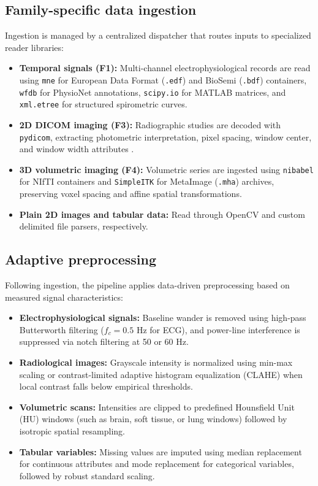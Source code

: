 \subsection{Family-specific data ingestion}
Ingestion is managed by a centralized dispatcher that routes inputs to specialized reader libraries:
\begin{itemize}
    \item \textbf{Temporal signals (F1):} Multi-channel electrophysiological records are read using \texttt{mne} \cite{gramfort2013mne} for European Data Format (\texttt{.edf}) and BioSemi (\texttt{.bdf}) containers, \texttt{wfdb} \cite{goldberger2000physionet} for PhysioNet annotations, \texttt{scipy.io} for MATLAB matrices, and \texttt{xml.etree} for structured spirometric curves.
    \item \textbf{2D DICOM imaging (F3):} Radiographic studies are decoded with \texttt{pydicom}, extracting photometric interpretation, pixel spacing, window center, and window width attributes \cite{dicom2023standard}.
    \item \textbf{3D volumetric imaging (F4):} Volumetric series are ingested using \texttt{nibabel} for NIfTI containers and \texttt{SimpleITK} \cite{lowekamp2013simpleitk} for MetaImage (\texttt{.mha}) archives, preserving voxel spacing and affine spatial transformations.
    \item \textbf{Plain 2D images and tabular data:} Read through OpenCV and custom delimited file parsers, respectively.
\end{itemize}

\subsection{Adaptive preprocessing}
Following ingestion, the pipeline applies data-driven preprocessing based on measured signal characteristics:
\begin{itemize}
    \item \textbf{Electrophysiological signals:} Baseline wander is removed using high-pass Butterworth filtering ($f_c = 0.5\text{ Hz}$ for ECG), and power-line interference is suppressed via notch filtering at 50 or 60 Hz.
    \item \textbf{Radiological images:} Grayscale intensity is normalized using min-max scaling or contrast-limited adaptive histogram equalization (CLAHE) when local contrast falls below empirical thresholds.
    \item \textbf{Volumetric scans:} Intensities are clipped to predefined Hounsfield Unit (HU) windows (such as brain, soft tissue, or lung windows) followed by isotropic spatial resampling.
    \item \textbf{Tabular variables:} Missing values are imputed using median replacement for continuous attributes and mode replacement for categorical variables, followed by robust standard scaling.
\end{itemize}

